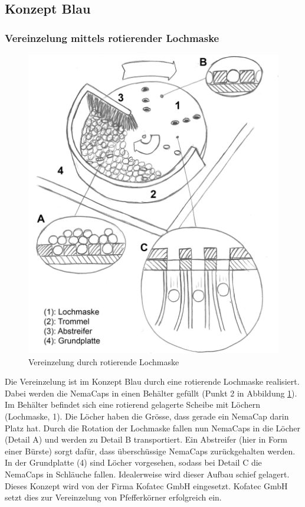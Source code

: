 \subsection{Konzept Blau}

\subsubsection{Vereinzelung mittels rotierender Lochmaske}
\begin{figure}
	\includegraphics[scale=0.52]{Illustrationen/5-Konzept/schema_vereinzelung.jpg}
	\caption{Vereinzelung durch rotierende Lochmaske}
	\label{fig:schema_vereinzelung}
\end{figure}
Die Vereinzelung ist im Konzept  Blau durch eine rotierende Lochmaske realisiert. Dabei werden die NemaCaps in einen Behälter gefüllt (Punkt 2 in Abbildung \ref{fig:schema_vereinzelung}). Im Behälter befindet sich eine rotierend gelagerte Scheibe mit Löchern (Lochmaske, 1). Die Löcher haben die Grösse, dass gerade ein NemaCap darin Platz hat. Durch die Rotation der Lochmaske fallen nun NemaCaps in die Löcher (Detail A) und werden zu Detail B transportiert. Ein Abstreifer (hier in Form einer Bürste) sorgt dafür, dass überschüssige NemaCaps zurückgehalten werden. In der Grundplatte (4) sind Löcher vorgesehen, sodass bei Detail C die NemaCaps in Schläuche fallen. Idealerweise wird dieser Aufbau schief gelagert. 
\newline
Dieses Konzept wird von der Firma Kofatec GmbH eingesetzt. Kofatec GmbH setzt dies zur Vereinzelung von Pfefferkörner erfolgreich ein.

